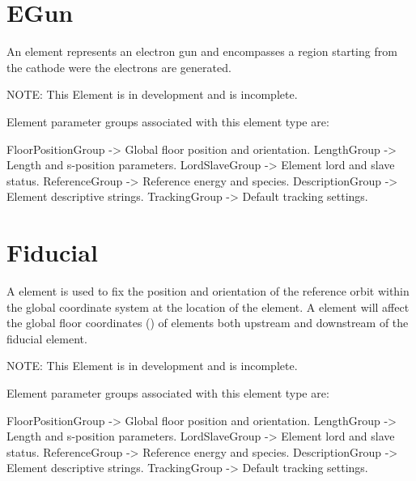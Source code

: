 \section{EGun}
\label{s:egun}

An  element represents an electron gun and encompasses a region starting from the cathode
were the electrons are generated.  

NOTE: This Element is in development and is incomplete.

Element parameter groups associated with this element type are:
\TOPrule
\begin{example}
  FloorPositionGroup -> Global floor position and orientation.  
  LengthGroup        -> Length and s-position parameters.  
  LordSlaveGroup     -> Element lord and slave status.  
  ReferenceGroup     -> Reference energy and species.  
  DescriptionGroup   -> Element descriptive strings.  
  TrackingGroup      -> Default tracking settings.  
\end{example}
\BOTTOMrule

\section{Fiducial}
\label{s:fiducial}

A  element is used to fix the position and orientation of the reference orbit within
the global coordinate system at the location of the  element. A  element
will affect the global floor coordinates () of elements both upstream and downstream
of the fiducial element.

NOTE: This Element is in development and is incomplete.

Element parameter groups associated with this element type are:
\TOPrule
\begin{example}
  FloorPositionGroup -> Global floor position and orientation.  
  LengthGroup        -> Length and s-position parameters.  
  LordSlaveGroup     -> Element lord and slave status.  
  ReferenceGroup     -> Reference energy and species.  
  DescriptionGroup   -> Element descriptive strings.  
  TrackingGroup      -> Default tracking settings.  
\end{example}
\BOTTOMrule


